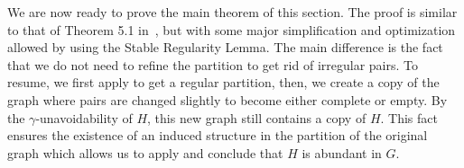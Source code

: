     We are now ready to prove the main theorem of this section.
    The proof is similar to that of Theorem 5.1 in~\cite{efficient_testing_of_large_graphs},
    but with some major simplification and optimization allowed by using the Stable Regularity Lemma.
    The main difference is the fact that we do not need to refine the partition to get rid of irregular pairs.
    To resume, we first apply  to get a regular partition,
    then, we create a copy of the graph where pairs are changed slightly to become either complete or empty.
    By the $\gamma$-unavoidability of $H$, this new graph still contains a copy of $H$.
    This fact ensures the existence of an induced structure in the partition of the original graph which allows
    us to apply  and conclude that $H$ is abundant in $G$.


